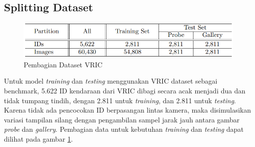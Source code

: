 \subsection{Splitting Dataset}

\begin{figure}[h!]
  \centering
  \includegraphics[scale=0.8]{gambar/Pembagian dataset VRIC.png}
  \caption{Pembagian Dataset VRIC}
  \label{fig:pembagiandatasetvric}
\end{figure}

Untuk model \emph{training} dan \emph{testing} menggunakan VRIC dataset sebagai benchmark, 5.622 ID kendaraan dari VRIC dibagi secara acak menjadi dua dan tidak tumpang tindih, dengan 
2.811 untuk \emph{training}, dan 2.811 untuk \emph{testing}. Karena tidak ada pencocokan ID berpasangan lintas kamera, maka disimulasikan variasi tampilan silang dengan pengambilan 
sampel jarak jauh antara gambar \emph{probe} dan \emph{gallery}.\parencite{Kanaci2018} Pembagian data untuk kebutuhan \emph{training} dan \emph{testing} dapat dilihat pada gambar 
\ref{fig:pembagiandatasetvric}.

